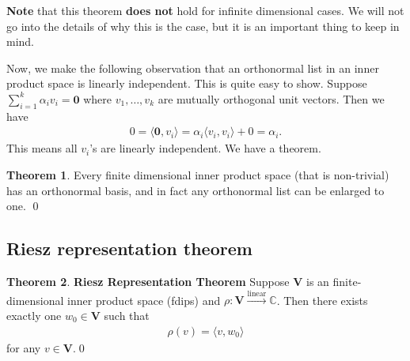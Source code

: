 \documentclass{article}
\theoremstyle{definition}
\newtheorem{thm}{Theorem}[section]
\newcommand{\C}{\mathbb{C}}
\newcommand{\V}{\mathbf{V}}
\newcommand{\lin}{\overset{\text{linear}}{\longrightarrow}}
\newcommand{\la}{\langle}
\newcommand{\ra}{\rangle}
\begin{document}
	\textbf{Note} that this theorem \textbf{does not} hold for infinite dimensional cases. We will not go into the details of why this is the case, but it is an important thing to keep in mind. 
	
	
	Now, we make the following observation that an orthonormal list in an inner product space is linearly independent. This is quite easy to show. Suppose $\sum^k_{i=1}\alpha_iv_i = \mathbf{0}$ where $v_1,\dots, v_k$ are mutually orthogonal unit vectors. Then we have
	\begin{align*}
	0 = \la \mathbf{0}, v_i \ra = \alpha_i \la v_i ,v_i \ra +0 = \alpha_i.
	\end{align*} 
	This means all $v_i$'s are linearly independent. We have a theorem.
	
	\begin{thm}
		Every finite dimensional inner product space (that is non-trivial) has an orthonormal basis, and in fact any orthonormal list can be enlarged to one. \qed
	\end{thm}
 
\subsection{Riesz representation theorem}

\begin{thm}\textbf{Riesz Representation Theorem}
	Suppose $\V$ is an finite-dimensional inner product space (fdips) and $\rho : \V \lin \C$. Then there exists exactly one $w_0 \in \V$ such that 
	\begin{align*}
	\rho(v) = \la  v, w_0\ra
	\end{align*}
	for any $v\in \V$.\qed	
\end{thm}
\end{document}
